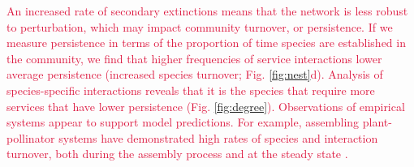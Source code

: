 \documentclass[twocolumn,preprintnumbers,amsmath,amssymb,superscriptaddress,linenumbers]{revtex4-1}
\newcommand{\rev}[1]{\textcolor{crimson}{#1}}
\begin{document}
\rev{An increased rate of secondary extinctions means that the network is less robust to perturbation, which may impact community turnover, or persistence.
If we measure persistence in terms of the proportion of time species are established in the community, we find that higher frequencies of service interactions lower average persistence (increased species turnover; Fig. \ref{fig:nest}d).
Analysis of species-specific interactions reveals that it is the species that require more services that have lower persistence (Fig. \ref{fig:degree}).
Observations of empirical systems appear to support model predictions.
For example, assembling plant-pollinator systems have demonstrated high rates of species and interaction turnover, both during the assembly process and at the steady state \cite{Ponisio2017}.}


\end{document}
